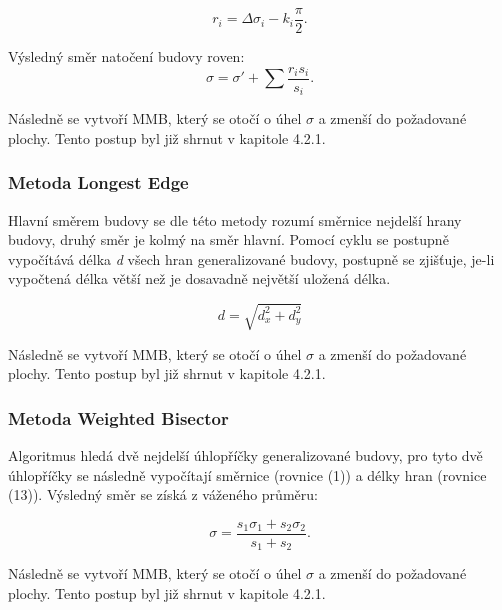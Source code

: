 \documentclass[11pt]{article}
\begin{document}
		\begin{equation}
			r_i = \Delta\sigma_i - k_i\dfrac{\pi}{2}.
		\end{equation}
		
		Výsledný směr natočení budovy roven:
		\begin{equation}
			\sigma=\sigma'+\sum\frac{r_is_i}{s_i}.
		\end{equation}
	
		Následně se vytvoří MMB, který se otočí o úhel $ \sigma $ a zmenší do požadované plochy. Tento postup byl již shrnut v kapitole 4.2.1.
		
		\subsubsection{Metoda Longest Edge}
		Hlavní směrem budovy se dle této metody rozumí směrnice nejdelší hrany budovy, druhý směr je kolmý na směr hlavní. 	
		Pomocí cyklu se postupně vypočítává délka \textit{d} všech hran generalizované budovy, postupně se zjišťuje, je-li vypočtená délka větší než je dosavadně největší uložená délka.
		
		\begin{equation}
			d = \sqrt{d_x ^2 + d_y ^2}
		\end{equation}
		
		Následně se vytvoří MMB, který se otočí o úhel $ \sigma $ a zmenší do požadované plochy. Tento postup byl již shrnut v kapitole 4.2.1.
		
		\subsubsection{Metoda Weighted Bisector}				 
		Algoritmus hledá dvě nejdelší úhlopříčky generalizované budovy, pro tyto dvě úhlopříčky se následně vypočítají směrnice (rovnice (1)) a délky hran (rovnice (13)). Výsledný směr se získá z váženého průměru:
		
		\begin{equation}
			\sigma = \frac{s_1\sigma_1+s_2\sigma_2}{s_1+s_2}.
		\end{equation}
	
		Následně se vytvoří MMB, který se otočí o úhel $ \sigma $ a zmenší do požadované plochy. Tento postup byl již shrnut v kapitole 4.2.1.
		
			
		
\end{document}
